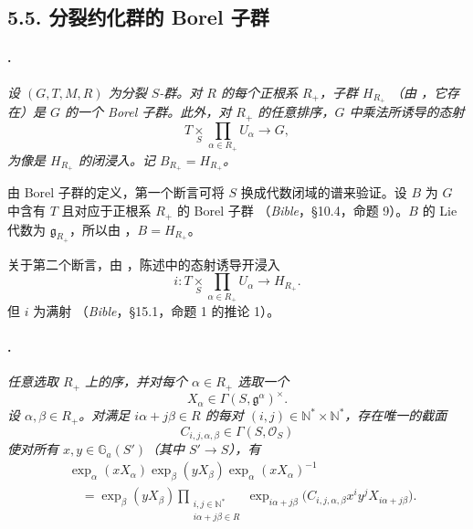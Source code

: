 \subsection*{5.5. 分裂约化群的 Borel 子群}

\paragraph{.}
\textit{设 \((G,T,M,R)\) 为分裂 \(S\)-群。对 \(R\) 的每个正根系 \(R_+\)，子群 \(H_{R_+}\) \textup{（由 ，它存在）}是 \(G\) 的一个 Borel 子群。此外，对 \(R_+\) 的任意排序，\(G\) 中乘法所诱导的态射}
\[
  T\mathop{\times}\limits_S
  \prod_{\alpha\in R_+}U_\alpha
  \longrightarrow G,
\]
\textit{为像是 \(H_{R_+}\) 的闭浸入。记 \(B_{R_+}=H_{R_+}\)。}

由 Borel 子群的定义，第一个断言可将 \(S\) 换成代数闭域的谱来验证。设 \(B\) 为 \(G\) 中含有 \(T\) 且对应于正根系 \(R_+\) 的 Borel 子群 \textup{（\emph{Bible}，\S10.4，命题 9）}。\(B\) 的 Lie 代数为 \(\mathfrak g_{R_+}\)，所以由 ，\(B=H_{R_+}\)。

关于第二个断言，由 ，陈述中的态射诱导开浸入
\[
  i:
  T\mathop{\times}\limits_S
  \prod_{\alpha\in R_+}U_\alpha
  \longrightarrow H_{R_+}.
\]
但 \(i\) 为满射 \textup{（\emph{Bible}，\S15.1，命题 1 的推论 1）}。

\paragraph{.}
\textit{任意选取 \(R_+\) 上的序，并对每个 \(\alpha\in R_+\) 选取一个}
\[
  X_\alpha\in\Gamma(S,\mathfrak g^\alpha)^\times.
\]
\textit{设 \(\alpha,\beta\in R_+\)。对满足 \(i\alpha+j\beta\in R\) 的每对 \((i,j)\in\mathbb N^*\times\mathbb N^*\)，存在唯一的截面}
\[
  C_{i,j,\alpha,\beta}\in\Gamma(S,\mathcal O_S)
\]
\textit{使对所有 \(x,y\in\mathbb G_a(S')\)（其中 \(S'\to S\)），有}
\[
\begin{aligned}
  &\exp_\alpha(xX_\alpha)
  \exp_\beta(yX_\beta)
  \exp_\alpha(xX_\alpha)^{-1}\\
  &\quad=
  \exp_\beta(yX_\beta)
  \prod_{\substack{i,j\in\mathbb N^*\\ i\alpha+j\beta\in R}}
    \exp_{i\alpha+j\beta}
      \bigl(C_{i,j,\alpha,\beta}x^iy^jX_{i\alpha+j\beta}\bigr).
\end{aligned}
\]

